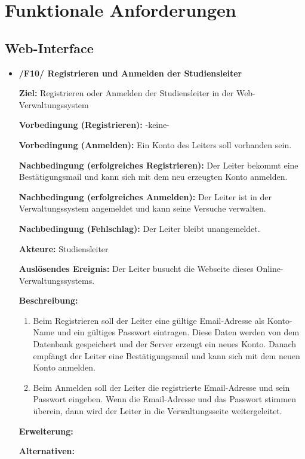 \documentclass[a4paper]{scrreprt}
\begin{document}
    \chapter{Funktionale Anforderungen}

        \section{\gls{Web-Interface}}
            \begin{itemize}
                \item \textbf{/F10/ Registrieren und Anmelden der \gls{Studiensleiter}}

                    \par \textbf{Ziel: }Registrieren oder Anmelden der \gls{Studiensleiter} in der Web-Verwaltungssystem
                    \par \textbf{Vorbedingung (Registrieren): }-keine-
                    \par \textbf{Vorbedingung (Anmelden): }Ein Konto des Leiters soll vorhanden sein.
                    \par \textbf{Nachbedingung (erfolgreiches Registrieren): }Der Leiter bekommt eine Bestätigungsmail und kann sich mit dem neu erzeugten Konto anmelden.
                    \par \textbf{Nachbedingung (erfolgreiches Anmelden): }Der Leiter ist in der Verwaltungssystem angemeldet und kann seine Versuche verwalten.
                    \par \textbf{Nachbedingung (Fehlschlag): }Der Leiter bleibt unangemeldet.
                    \par \textbf{Akteure: }\gls{Studiensleiter}
                    \par \textbf{Auslösendes Ereignis: }Der Leiter busucht die Webseite dieses Online-Verwaltungssystems.
                    \par \textbf{Beschreibung: }
                        \begin{enumerate}
                            \item Beim Registrieren soll der Leiter eine gültige Email-Adresse als Konto-Name und ein gültiges Passwort eintragen. Diese Daten werden von dem Datenbank gespeichert und der Server erzeugt ein neues Konto. Danach empfängt der Leiter eine Bestätigungsmail und kann sich mit dem neuen Konto anmelden.
                            \item Beim Anmelden soll der Leiter die registrierte Email-Adresse und sein Passwort eingeben. Wenn die Email-Adresse und das Passwort stimmen überein, dann wird der Leiter in die Verwaltungsseite weitergeleitet.
                        \end{enumerate}
                    \par \textbf{Erweiterung: }
                    \par \textbf{Alternativen: }



\end{itemize}
\end{document}
